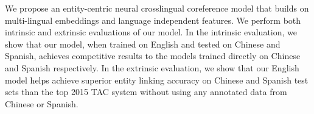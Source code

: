 We propose an entity-centric neural crosslingual coreference model that builds on multi-lingual embeddings and language independent features. We perform both intrinsic and extrinsic evaluations of our model. In the intrinsic evaluation, we show that our model, when trained on English and tested on Chinese and Spanish, achieves competitive results to the models trained directly on Chinese and Spanish respectively. In the extrinsic evaluation, we show that our English model helps achieve superior entity linking accuracy on Chinese and Spanish test sets than the top 2015 TAC system without using any annotated data from Chinese or Spanish.
